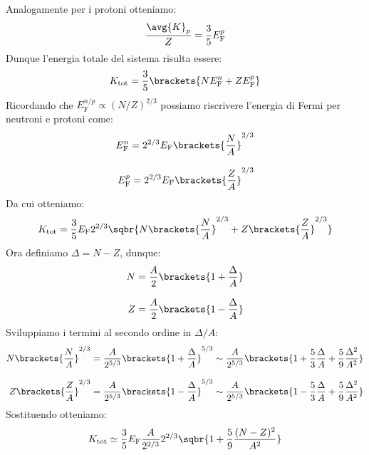 Analogamente per i protoni otteniamo:
\begin{equation}
    \dfrac{\avg{K}_{p}}{Z} = \dfrac{3}{5} E_{\text{F}}^p
\end{equation}
Dunque l'energia totale del sistema risulta essere:
\begin{equation}
    K_{\text{tot}} = \dfrac{3}{5} \brackets{N E_{\text{F}}^n + Z E_{\text{F}}^p}
\end{equation}
Ricordando che $E_{\text{F}}^{n/p} \propto (N/Z)^{2/3}$ possiamo riscrivere l'energia di Fermi per neutroni e protoni come:
\begin{equation}
    \begin{split}
        E_{\text{F}}^n = 2^{2/3}E_{\text{F}} \brackets{\dfrac{N}{A}}^{2/3} \\[8pt]
        E_{\text{F}}^p = 2^{2/3} E_{\text{F}} \brackets{\dfrac{Z}{A}}^{2/3}
    \end{split}
\end{equation}
Da cui otteniamo:
\begin{equation}
    K_{\text{tot}} = \dfrac{3}{5} E_{\text{F}} 2^{2/3} \sqbr{N \brackets{\dfrac{N}{A}}^{2/3} + Z \brackets{\dfrac{Z}{A}}^{2/3}}
\end{equation}
Ora definiamo $\Delta = N-Z$, dunque:
\begin{equation}
    \begin{split}
        N &= \dfrac{A}{2}\brackets{1 + \dfrac{\Delta}{A}} \\[8pt]
        Z &= \dfrac{A}{2}\brackets{1 - \dfrac{\Delta}{A}}
    \end{split}
\end{equation}
Sviluppiamo i termini al secondo ordine in $\Delta/A$:
\begin{equation}
    \begin{split}
        N \brackets{\dfrac{N}{A}}^{2/3} &= \dfrac{A}{2^{5/3}} \brackets{1 + \dfrac{\Delta}{A}}^{5/3} \sim \dfrac{A}{2^{5/3}} \brackets{1 + \dfrac{5}{3} \dfrac{\Delta}{A} + \dfrac{5}{9} \dfrac{\Delta^2}{A^2}} \\[8pt]
        Z \brackets{\dfrac{Z}{A}}^{2/3} &= \dfrac{A}{2^{5/3}} \brackets{1 - \dfrac{\Delta}{A}}^{5/3} \sim \dfrac{A}{2^{5/3}} \brackets{1 - \dfrac{5}{3} \dfrac{\Delta}{A} + \dfrac{5}{9} \dfrac{\Delta^2}{A^2}}
    \end{split}
\end{equation}
Sostituendo otteniamo:
\begin{equation}
    K_{\text{tot}} \simeq \dfrac{3}{5} E_{\text{F}} \dfrac{A}{2^{2/3}} 2^{2/3}\sqbr{1 + \dfrac{5}{9} \dfrac{(N-Z)^2}{A^2}}
\end{equation}
